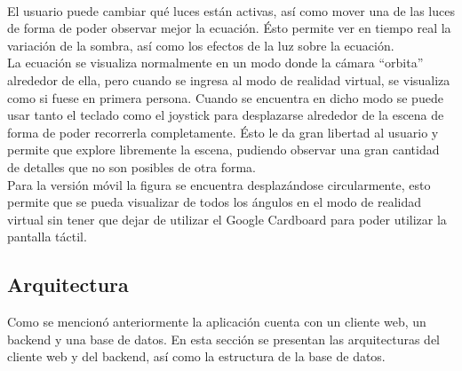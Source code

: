 \documentclass[12pt]{article}
\begin{document}
\\El usuario puede cambiar qué luces están activas, así como mover una de las luces de forma de poder observar mejor la ecuación. Ésto permite ver en tiempo real la variación de la sombra, así como los efectos de la luz sobre la ecuación. 
\\La ecuación se visualiza normalmente en un modo donde la cámara “orbita” alrededor de ella, pero cuando se ingresa al modo de realidad virtual, se visualiza como si fuese en primera persona. Cuando se encuentra en dicho modo se puede usar tanto el teclado como el joystick para desplazarse alrededor de la escena de forma de poder recorrerla completamente. Ésto le da gran libertad al usuario y permite que explore libremente la escena, pudiendo observar una gran cantidad de detalles que no son posibles de otra forma.
\\Para la versión móvil la figura se encuentra desplazándose circularmente, esto permite que se pueda visualizar de todos los ángulos en el modo de realidad virtual sin tener que dejar de utilizar el Google Cardboard para poder utilizar la pantalla táctil.
\clearpage
\subsection{Arquitectura}
Como se mencionó anteriormente la aplicación cuenta con un cliente web, un backend y una base de datos. En esta sección se presentan las arquitecturas del cliente web y del backend, así como la estructura de la base de datos.
\end{document}
